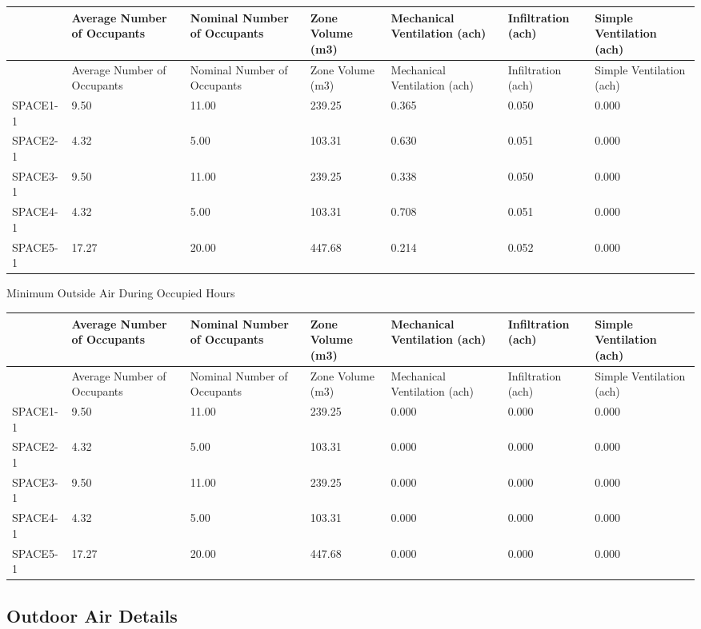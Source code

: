 \begin{longtable}[c]{>{\raggedright}p{0.85in}>{\raggedright}p{0.85in}>{\raggedright}p{0.85in}>{\raggedright}p{0.85in}>{\raggedright}p{0.85in}>{\raggedright}p{0.85in}>{\raggedright}p{0.85in}}
\toprule
~ & Average Number of Occupants & Nominal Number of Occupants & Zone Volume (m3) & Mechanical Ventilation (ach) & Infiltration (ach) & Simple Ventilation (ach) \tabularnewline
\midrule
\endfirsthead

\toprule
~ & Average Number of Occupants & Nominal Number of Occupants & Zone Volume (m3) & Mechanical Ventilation (ach) & Infiltration (ach) & Simple Ventilation (ach) \tabularnewline
\midrule
\endhead

SPACE1-1 & 9.50 & 11.00 & 239.25 & 0.365 & 0.050 & 0.000 \tabularnewline
SPACE2-1 & 4.32 & 5.00 & 103.31 & 0.630 & 0.051 & 0.000 \tabularnewline
SPACE3-1 & 9.50 & 11.00 & 239.25 & 0.338 & 0.050 & 0.000 \tabularnewline
SPACE4-1 & 4.32 & 5.00 & 103.31 & 0.708 & 0.051 & 0.000 \tabularnewline
SPACE5-1 & 17.27 & 20.00 & 447.68 & 0.214 & 0.052 & 0.000 \tabularnewline
\bottomrule
\end{longtable}

Minimum Outside Air During Occupied Hours

\begin{longtable}[c]{>{\raggedright}p{0.85in}>{\raggedright}p{0.85in}>{\raggedright}p{0.85in}>{\raggedright}p{0.85in}>{\raggedright}p{0.85in}>{\raggedright}p{0.85in}>{\raggedright}p{0.85in}}
\toprule
~ & Average Number of Occupants & Nominal Number of Occupants & Zone Volume (m3) & Mechanical Ventilation (ach) & Infiltration (ach) & Simple Ventilation (ach) \tabularnewline
\midrule
\endfirsthead

\toprule
~ & Average Number of Occupants & Nominal Number of Occupants & Zone Volume (m3) & Mechanical Ventilation (ach) & Infiltration (ach) & Simple Ventilation (ach) \tabularnewline
\midrule
\endhead

SPACE1-1 & 9.50 & 11.00 & 239.25 & 0.000 & 0.000 & 0.000 \tabularnewline
SPACE2-1 & 4.32 & 5.00 & 103.31 & 0.000 & 0.000 & 0.000 \tabularnewline
SPACE3-1 & 9.50 & 11.00 & 239.25 & 0.000 & 0.000 & 0.000 \tabularnewline
SPACE4-1 & 4.32 & 5.00 & 103.31 & 0.000 & 0.000 & 0.000 \tabularnewline
SPACE5-1 & 17.27 & 20.00 & 447.68 & 0.000 & 0.000 & 0.000 \tabularnewline
\bottomrule
\end{longtable}

\subsection{Outdoor Air Details}\label{outdoor-air-details}

